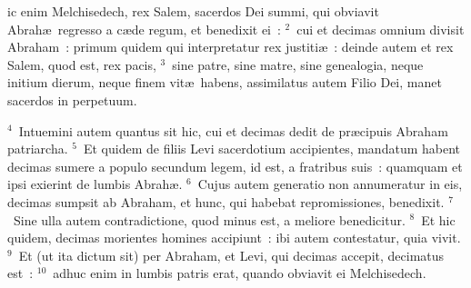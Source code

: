 \bchapter
{}ic enim Melchisedech, rex Salem, sacerdos Dei summi, qui obviavit Abrah\ae\ regresso a c\ae de regum, et benedixit ei~:
${}^{2}$~cui et decimas omnium divisit Abraham~: primum quidem qui interpretatur rex justiti\ae~: deinde autem et rex Salem, quod est, rex pacis,
${}^{3}$~sine patre, sine matre, sine genealogia, neque initium dierum, neque finem vit\ae\ habens, assimilatus autem Filio Dei, manet sacerdos in perpetuum.


${}^{4}$~Intuemini autem quantus sit hic, cui et decimas dedit de pr\ae cipuis Abraham patriarcha.
${}^{5}$~Et quidem de filiis Levi sacerdotium accipientes, mandatum habent decimas sumere a populo secundum legem, id est, a fratribus suis~: quamquam et ipsi exierint de lumbis Abrah\ae .
${}^{6}$~Cujus autem generatio non annumeratur in eis, decimas sumpsit ab Abraham, et hunc, qui habebat repromissiones, benedixit.
${}^{7}$~Sine ulla autem contradictione, quod minus est, a meliore benedicitur.
${}^{8}$~Et hic quidem, decimas morientes homines accipiunt~: ibi autem contestatur, quia vivit.
${}^{9}$~Et (ut ita dictum sit) per Abraham, et Levi, qui decimas accepit, decimatus est~:
${}^{10}$~adhuc enim in lumbis patris erat, quando obviavit ei Melchisedech.


